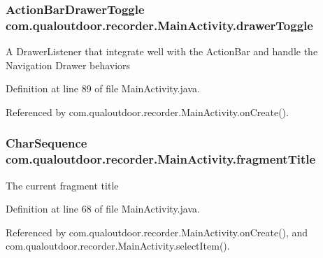 \hypertarget{classcom_1_1qualoutdoor_1_1recorder_1_1MainActivity_a6c372005bb6ce12e7204e6e3729b9dab}{
\subsubsection[{drawer\-Toggle}]{\setlength{\rightskip}{0pt plus 5cm}Action\-Bar\-Drawer\-Toggle com.\-qualoutdoor.\-recorder.\-Main\-Activity.\-drawer\-Toggle\hspace{0.3cm}{\ttfamily [private]}}}\label{classcom_1_1qualoutdoor_1_1recorder_1_1MainActivity_a6c372005bb6ce12e7204e6e3729b9dab}
A Drawer\-Listener that integrate well with the Action\-Bar and handle the Navigation Drawer behaviors 

Definition at line 89 of file Main\-Activity.\-java.



Referenced by com.\-qualoutdoor.\-recorder.\-Main\-Activity.\-on\-Create().

\hypertarget{classcom_1_1qualoutdoor_1_1recorder_1_1MainActivity_a5959b69046a6d1ca238b4bed45b02d26}{
\subsubsection[{fragment\-Title}]{\setlength{\rightskip}{0pt plus 5cm}Char\-Sequence com.\-qualoutdoor.\-recorder.\-Main\-Activity.\-fragment\-Title\hspace{0.3cm}{\ttfamily [private]}}}\label{classcom_1_1qualoutdoor_1_1recorder_1_1MainActivity_a5959b69046a6d1ca238b4bed45b02d26}
The current fragment title 

Definition at line 68 of file Main\-Activity.\-java.



Referenced by com.\-qualoutdoor.\-recorder.\-Main\-Activity.\-on\-Create(), and com.\-qualoutdoor.\-recorder.\-Main\-Activity.\-select\-Item().

